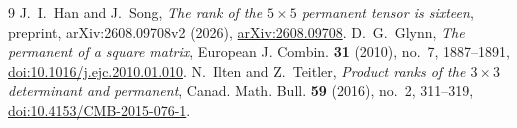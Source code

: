 \documentclass[11pt]{amsart}
\theoremstyle{remark}
\numberwithin{equation}{section}
\begin{document}
\begin{thebibliography}{9}
J.~I.~Han and J.~Song, \emph{The rank of the \(5\times5\) permanent tensor
is sixteen}, preprint, arXiv:2608.09708v2 (2026),
\href{https://arxiv.org/abs/2608.09708}{arXiv:2608.09708}.
D.~G.~Glynn, \emph{The permanent of a square matrix},
European J. Combin. \textbf{31} (2010), no.~7, 1887--1891,
\href{https://doi.org/10.1016/j.ejc.2010.01.010}{doi:10.1016/j.ejc.2010.01.010}.
N.~Ilten and Z.~Teitler, \emph{Product ranks of the \(3\times3\)
determinant and permanent}, Canad. Math. Bull. \textbf{59} (2016),
no.~2, 311--319,
\href{https://doi.org/10.4153/CMB-2015-076-1}{doi:10.4153/CMB-2015-076-1}.
\end{thebibliography}
\end{document}
